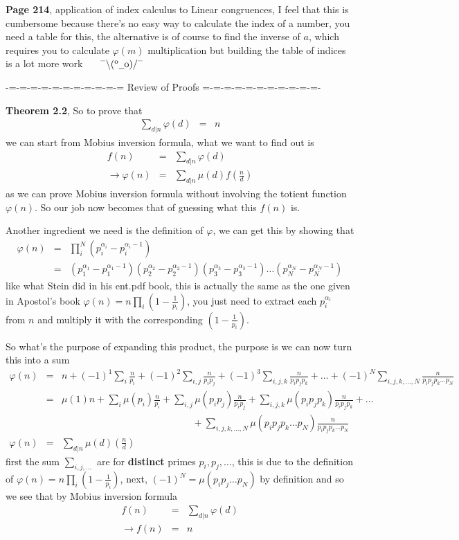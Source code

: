 \documentclass[aps,preprint,preprintnumbers,nofootinbib,showpacs,prd]{revtex4-1}
\newcommand{\nbea}{\begin{eqnarray*}}
\newcommand{\neea}{\end{eqnarray*}}
\newcommand{\dunno}{$ {}^{\mbox {--}}\backslash(^{\rm o}{}\underline{\hspace{0.2cm}}{\rm o})/^{\mbox {--}}$}
\begin{document}
{\bf Page 214}, application of index calculus to Linear congruences, I feel that this is cumbersome because there's no easy way to calculate the index of a number, you need a table for this, the alternative is of course to find the inverse of $a$, which requires you to calculate $\varphi(m)$ multiplication but building the table of indices is a lot more work ~~~\dunno




-=-=-=-=-=-=-=-=-=-=-= Review of Proofs  =-=-=-=-=-=-=-=-=-=-=-


{\bf Theorem 2.2}, So to prove that
%
\nbea
\sum_{d|n}\varphi(d) & = & n
\neea
%
we can start from Mobius inversion formula, what we want to find out is
%
\nbea
f(n) & = & \sum_{d|n} \varphi(d) \\
\to \varphi(n) & = & \sum_{d|n}\mu(d) f\left(\frac{n}{d}\right)
\neea
%
as we can prove Mobius inversion formula without involving the totient function $\varphi(n)$. So our job now becomes that of guessing what this $f(n)$ is.

Another ingredient we need is the definition of $\varphi$, we can get this by showing that 
%
\nbea
\varphi(n) & = & \prod_i^N (p_i^{\alpha_i} - p_i^{\alpha_i-1}) \\
& = & \left ( p_1^{\alpha_1} - p_1^{\alpha_1-1}\right ) \left ( p_2^{\alpha_2} - p_2^{\alpha_2-1}\right ) \left ( p_3^{\alpha_3} - p_3^{\alpha_3-1}\right ) \ldots \left ( p_N^{\alpha_N} - p_N^{\alpha_N-1}\right )
\neea
%
like what Stein did in his ent.pdf book, this is actually the same as the one given in Apostol's book $\varphi(n) = n\prod_i\left(1-\frac{1}{p_i}\right)$, you just need to extract each $p_i^{\alpha_i}$ from $n$ and multiply it with the corresponding $\left(1-\frac{1}{p_i}\right)$.

So what's the purpose of expanding this product, the purpose is we can now turn this into a sum
%
\nbea
\varphi(n) & = & n + (-1)^1\sum_{i}\frac{n}{p_i} + (-1)^2\sum_{i,j}\frac{n}{p_i p_j} +(-1)^3\sum_{i,j,k}\frac{n}{p_i p_j p_k} + \ldots + (-1)^N\sum_{i,j,k,\ldots,N} \frac{n}{p_i p_j p_k \ldots p_N} \\
& = & \mu(1)n + \sum_{i}\mu(p_i)\frac{n}{p_i} + \sum_{i,j}\mu(p_ip_j)\frac{n}{p_i p_j} + \sum_{i,j,k} \mu(p_ip_jp_k)\frac{n}{p_i p_j p_k} + \ldots \\
&& ~~~~~~~~~~~~~~~~~~~~~~~~~~~~~~~~~~~~~~~~~~~~~~~~~~~~~~~~~~~~~ + \sum_{i,j,k,\ldots,N} \mu(p_i p_j p_k \ldots p_N)\frac{n}{p_i p_j p_k \ldots p_N} \\
\varphi(n) & = & \sum_{d|n}\mu(d)\left ( \frac{n}{d}\right )
\neea
%
first the sum $\sum_{i,j,\ldots}$ are for {\bf distinct} primes $p_i,p_j,\ldots$, this is due to the definition of $\varphi(n) = n\prod_i\left(1-\frac{1}{p_i}\right)$, next, $(-1)^N = \mu(p_i p_j\ldots p_N)$ by definition and so we see that by Mobius inversion formula
%
\nbea
f(n) & = & \sum_{d|n}\varphi(d) \\
\to f(n) & = & n
\neea
%
\end{document}

